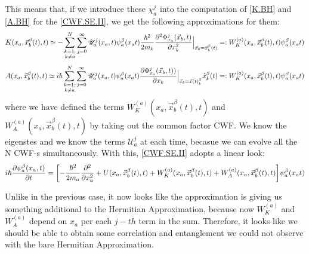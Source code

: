 \documentclass[11pt, a4paper]{article} %
\newcommand{\U}{\mathscr{U}}
\begin{document}
This means that, if we introduce these $\chi^j_a$ into the computation of \ref{K.BH} and \ref{A.BH} for the \ref{CWF.SE.II}, we get the following approximations for them:
$$
K(x_a, \vec{x}_b^\beta(t), t) \simeq - \sum_{\substack{k=1; \\ k\neq a}}^{N} \sum_{j=0}^\infty \U^j_a(x_a,t)\psi_a^\beta(x_a t) \frac{\hbar^2}{2m_k} \pdv[2]{ \Phi_{x_a}^j(\vec{x}_b,t)}{x_k}\Big\rvert_{\vec{x}_b=\vec{x}_b^\beta(t)}=:W_K^{(a)}(x_a, \vec{x}_b^\beta (t),t)\psi_a^\beta(x_a t)
$$
$$
A(x_a, \vec{x}_b^\beta(t), t) \simeq i \hbar \sum_{\substack{k=1; \\ k\neq a}}^{N} \sum_{j=0}^\infty \U^j_a(x_a,t)\psi_a^\beta(x_a t) \pdv{ \Phi_{x_a}^j(\vec{x}_b,t))}{x_k}\Big\rvert_{\vec{x}_b=\vec{x}(t)_b^\beta} \dot{x}_k^\beta(t)=:W_K^{(a)}(x_a, \vec{x}_b^\beta (t),t)\psi_a^\beta(x_a t)
$$
where we have defined the terms $W_K^{(a)}(x_a, \vec{x}_b^\beta (t),t)$ and $W_A^{(a)}(x_a, \vec{x}_b^\beta (t),t)$ by taking out the common factor CWF. We know the eigenstes and we know the terms $\U^j_a$ at each time, becasue we can evolve all the N CWF-s simultaneously. With this, \ref{CWF.SE.II} adopts a linear look:
$$
i\hbar \pdv{\psi_a^\beta(x_a, t)}{t} = \qty[- \frac{\hbar^2}{2m_a}\pdv[2]{}{x_a} + U(x_a, \vec{x}_b^\beta(t), t)+ W^{(a)}_K(x_a,\vec{x}_b^\beta (t),t) +W^{(a)}_A(x_a,\vec{x}_b^\beta (t),t) ]\psi_a^\beta(x_a t)
$$

Unlike in the previous case, it now looks like the approximation is giving us something additional to the Hermitian Approximation, because now $W^{(a)}_K$ and $W^{(a)}_A$ depend on $x_a$ per each $j-th$ term in the sum. Therefore, it looks like we should be able to obtain some correlation and entanglement we could not observe with the bare Hermitian Approximation.\\
\end{document}
